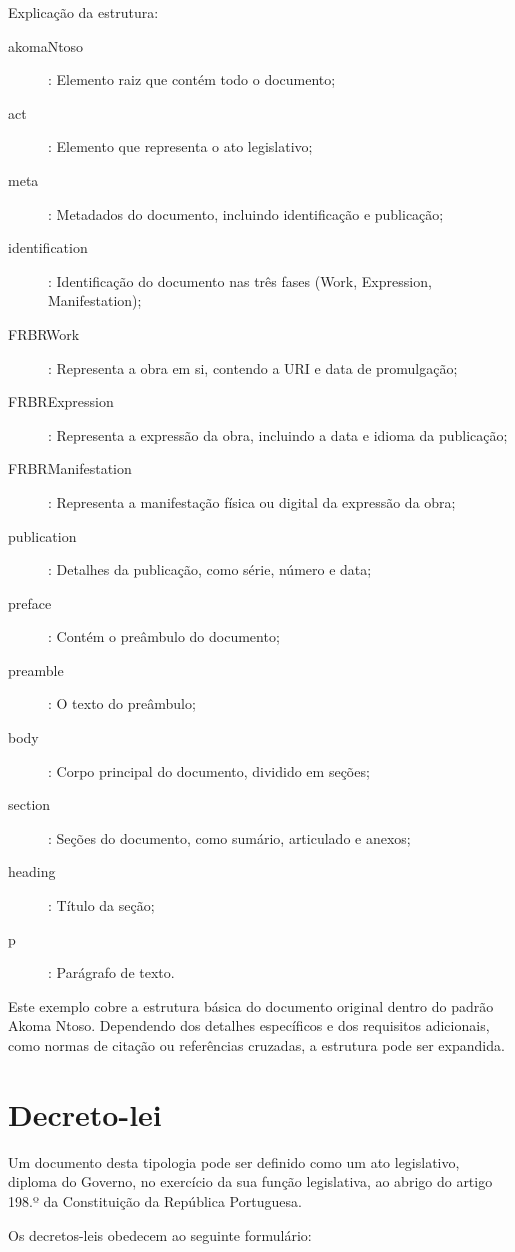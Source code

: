 Explicação da estrutura:
\begin{description}
\item[akomaNtoso]: Elemento raiz que contém todo o documento;
\item[act]: Elemento que representa o ato legislativo;
\item[meta]: Metadados do documento, incluindo identificação e publicação;
\item[identification]: Identificação do documento nas três fases (Work, Expression, Manifestation);
\item[FRBRWork]: Representa a obra em si, contendo a URI e data de promulgação;
\item[FRBRExpression]: Representa a expressão da obra, incluindo a data e idioma da publicação;
\item[FRBRManifestation]: Representa a manifestação física ou digital da expressão da obra;
\item[publication]: Detalhes da publicação, como série, número e data;
\item[preface]: Contém o preâmbulo do documento;
\item[preamble]: O texto do preâmbulo;
\item[body]: Corpo principal do documento, dividido em seções;
\item[section]: Seções do documento, como sumário, articulado e anexos;
\item[heading]: Título da seção;
\item[p]: Parágrafo de texto.
\end{description}

Este exemplo cobre a estrutura básica do documento original dentro do padrão Akoma Ntoso. 
Dependendo dos detalhes específicos e dos requisitos adicionais, como normas de citação ou referências cruzadas, 
a estrutura pode ser expandida.


\section{Decreto-lei}

Um documento desta tipologia pode ser definido como um ato legislativo, diploma do Governo, no exercício 
da sua função legislativa, ao abrigo do artigo 198.º da Constituição da República Portuguesa.

Os decretos-leis obedecem ao seguinte formulário:

